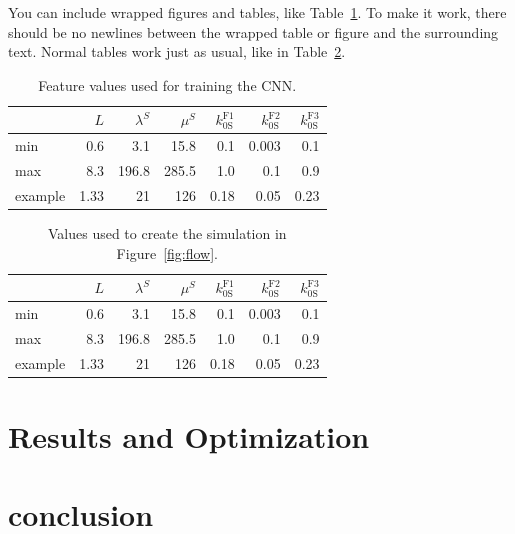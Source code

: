 \documentclass[11pt,table]{article}
\begin{document}

You can include wrapped figures and tables, like Table~\ref{tab:features}. To make it work, there should be no newlines between the wrapped table or figure and the surrounding text. Normal tables work just as usual, like in Table~\ref{tab:other_parameters}.\\

\begin{table}
	\begin{tabular}{@{} lrrrrrr @{}}
		\toprule
		 & $L$ & $\lambda^S$ & $\mu^S$ & $k_{0\text{S}}^{\text{F}1}$ & $k_{0\text{S}}^{\text{F}2}$ & $k_{0\text{S}}^{\text{F}3}$ \\
		\midrule
		min & 0.6 & 3.1 & 15.8 & 0.1 & 0.003 & 0.1 \\
		max & 8.3 & 196.8 & 285.5 & 1.0 & 0.1 & 0.9 \\
		example & 1.33 & 21 & 126 & 0.18 & 0.05 & 0.23 \\
		\bottomrule
	\end{tabular}
	\caption{Feature values used for training the CNN.}\label{tab:features}
\end{table} 



\begin{table}[]
	\centering
	\begin{tabular}{@{} lrrrrrr @{}} 
		\toprule
		 & $L$ & $\lambda^S$ & $\mu^S$ & $k_{0\text{S}}^{\text{F}1}$ & $k_{0\text{S}}^{\text{F}2}$ & $k_{0\text{S}}^{\text{F}3}$ \\
		\midrule
		min & 0.6 & 3.1 & 15.8 & 0.1 & 0.003 & 0.1 \\
		max & 8.3 & 196.8 & 285.5 & 1.0 & 0.1 & 0.9 \\
		example & 1.33 & 21 & 126 & 0.18 & 0.05 & 0.23 \\
		\bottomrule
	\end{tabular}
	\caption{Values used to create the simulation in Figure~\ref{fig:flow}.}\label{tab:other_parameters}
\end{table}


\section{Results and Optimization}
\section{conclusion}
\end{document}
